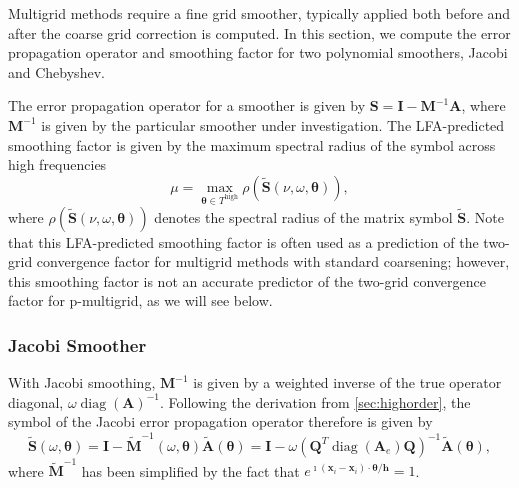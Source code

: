\documentclass[review]{siamart190516}
\DeclareMathOperator{\diag}{diag}
\begin{document}
Multigrid methods require a fine grid smoother, typically applied both before and after the coarse grid correction is computed.
In this section, we compute the error propagation operator and smoothing factor for two polynomial smoothers, Jacobi and Chebyshev.

The error propagation operator for a smoother is given by $\mathbf{S} = \mathbf{I} - \mathbf{M}^{-1} \mathbf{A}$, where $\mathbf{M}^{-1}$ is given by the particular smoother under investigation.
The LFA-predicted smoothing factor is given by the maximum spectral radius of the symbol across high frequencies
\begin{equation}
\mu = \max_{\boldsymbol{\theta} \in T^{\text{high}}} \rho \left( \tilde{\mathbf{S}} \left( \nu, \omega, \boldsymbol{\theta} \right) \right),
\end{equation}
where $ \rho \left( \tilde{\mathbf{S}} \left( \nu, \omega, \boldsymbol{\theta} \right)\right)$ denotes the spectral radius of the matrix symbol $\tilde{\mathbf{S}}$.
Note that this LFA-predicted smoothing factor is often used as a prediction of the two-grid convergence factor for multigrid methods with standard coarsening; however, this smoothing factor is not an accurate predictor of the two-grid convergence factor for p-multigrid, as we will see below.

\subsubsection{Jacobi Smoother}\label{sec:jacobi}

With Jacobi smoothing, $\mathbf{M}^{-1}$ is given by a weighted inverse of the true operator diagonal, $\omega \diag \left( \mathbf{A} \right)^{-1}$.
Following the derivation from \cref{sec:highorder}, the symbol of the Jacobi error propagation operator therefore is given by
\begin{equation}
\tilde{\mathbf{S}} \left( \omega, \boldsymbol{\theta} \right) = \mathbf{I} - \tilde{\mathbf{M}}^{-1} \left( \omega, \boldsymbol{\theta} \right) \tilde{\mathbf{A}} \left( \boldsymbol{\theta} \right) = \mathbf{I} - \omega \left( \mathbf{Q}^T \diag \left( \mathbf{A}_e \right) \mathbf{Q} \right)^{-1} \tilde{\mathbf{A}} \left( \boldsymbol{\theta} \right),
\end{equation}
where $\tilde{\mathbf{M}}^{-1}$ has been simplified by the fact that $e^{\imath \left( \mathbf{x}_i - \mathbf{x}_i \right) \cdot \boldsymbol{\theta} / \mathbf{h}} = 1$.
\end{document}
